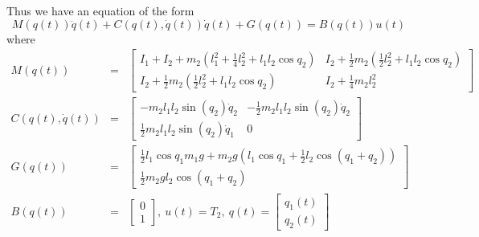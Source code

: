 Thus we have an equation of the form
\begin{equation}
	M\left(q(t)\right)\ddot{q}(t) + C\left(q(t),\dot{q}(t)\right)\dot{q}(t)
	 + G\left(q(t)\right) = B\left(q(t)\right)u(t)
\end{equation} where
\begin{eqnarray*}
	M\left(q(t)\right) &=& \begin{bmatrix}
		I_1 + I_2 + m_2\left(l_1^2 + \frac{1}{4}l_2^2 + l_1l_2\cos{q_2}\right) &
		I_2 + \frac{1}{2}m_2\left(\frac{1}{2}l_2^2 + l_1l_2\cos{q_2}\right) \\
		I_2 + \frac{1}{2}m_2\left(\frac{1}{2}l_2^2 + l_1l_2\cos{q_2}\right) &
		I_2 + \frac{1}{4}m_2l_2^2
	\end{bmatrix} \\
	C\left(q(t),\dot{q}(t)\right) &=& \begin{bmatrix}
		-m_2 l_1 l_2 \sin({q_2}) \dot{q}_2 &
		-\frac{1}{2}m_2 l_1 l_2 \sin({q_2}) \dot{q}_2 \\
		\frac{1}{2}m_2 l_1 l_2 \sin({q_2}) \dot{q}_1 & 0
	\end{bmatrix} \\
	G\left(q(t)\right) &=& \begin{bmatrix}
		\frac{1}{2}l_1 \cos{q_1} m_1 g + m_2 g \left(l_1 \cos{q_1} + \frac{1}{2}l_2 \cos{(q_1 + q_2)} \right) \\
		\frac{1}{2} m_2 g l_2 \cos{(q_1 + q_2)}
	\end{bmatrix} \\
	B\left(q(t)\right) &=& \begin{bmatrix}
		0 \\ 1
	\end{bmatrix}, ~
	u(t) = T_2, ~
	q(t) = \begin{bmatrix}
		q_1(t) \\ q_2(t)
	\end{bmatrix}
\end{eqnarray*}